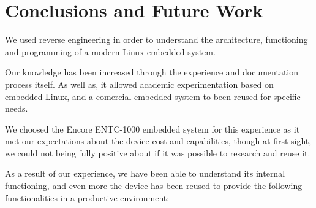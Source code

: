 \documentclass[conference]{IEEEtran}
\newcommand{\nota}[1]{}
\begin{document}
\section{Conclusions and Future Work}

\nota{Se utilizó ingeniería inversa para entender la arquitectura, funcionamiento
y la programación de un sistema Linux embebido moderno.

La experiencia y documentación del proceso
nos permitió obtener mayor conocimiento del tema,
posibilitó la experimentación académica con Linux embebido, y
permitió el reuso de un sistema embebido comercial para necesidades
específicas.}

We used reverse engineering in order to understand the architecture, 
functioning and programming of a modern Linux embedded system.

Our knowledge has been increased through the experience and
documentation process itself. As well as, it allowed academic 
experimentation based on embedded Linux, and a comercial 
embedded system to been reused for specific needs. 

\nota{
Se seleccionó el hardware Encore ENTC-1000 porque cubre
las expectativas de prestaciones, aún cuando no se conocía,
en un primer momento, si sería posible estudiarlo y reutilizarlo.

Afortunadamente, y luego de esta experiencia, no sólo
se ha logrado entender el funcionamiento interno, sino que
tambien, se está reutilizando de manera productiva para
cumplir disintos roles :
}
We choosed the Encore ENTC-1000 embedded system for this experience
as it met our expectations about the device cost and capabilities, 
though at first sight, we could not being fully positive about if 
it was possible to research and reuse it. 

As a result of our experience, we have been able to 
understand its internal functioning, and even more the device 
has been reused to provide the following functionalities in a 
productive environment: 

\nota{
\begin{itemize}
\item Como servidor de impresión para impresoras USB sin conexiones de red.
\item Como servidor DHCP en pequeñas redes internas de la Universidad.
\item Como cerebro de un robot experimental, que se comunica con 
un microcontrolador y sensores.
\item Como sistema Linux embebido para aprendizaje y experimentación.
\item Y como un servidor DNS experimental.
\end{itemize}
}
\end{document}
